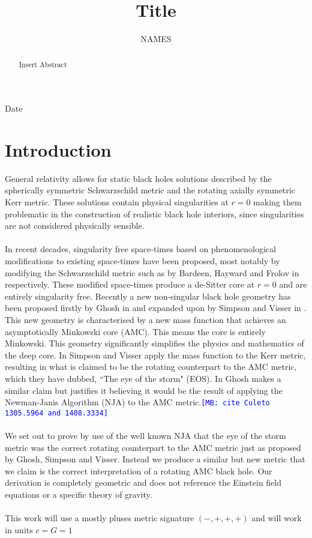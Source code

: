 \documentclass[12pt]{iopart}
\def\mbc#1{\textcolor{blue}{\tt[MB: #1]}}
\begin{document}
\title[Author guidelines for IOP Publishing journals in  \LaTeXe]{Title}

\author{NAMES}

\address{Institute of Cosmology and Gravitation
Dennis Sciama Building,Burnaby Road,Portsmouth,PO1 3FX, UK}
\vspace{10pt}
\begin{indented}
\item[]Date
\end{indented}

\begin{abstract}
Insert Abstract
\end{abstract}



\section{Introduction}
General relativity allows for static black holes solutions described by the spherically symmetric Schwarzschild metric and the rotating axially symmetric Kerr metric. These solutions contain physical singularities at $r=0$ making them problematic in the construction of realistic black hole interiors, since singularities are not considered physically sensible.
\\
\\
In recent decades, singularity free space-times based on phenomenological modifications to existing space-times have been proposed, most notably by modifying the Schwarzschild metric such as by Bardeen, Hayward and Frolov in \cite{Bardeen:1968, Hayward:2005gi, Frolov:2016pav} respectively. These modified space-times produce a de-Sitter core at $r=0$ and are entirely singularity free. Recently a new non-singular black hole geometry has been proposed firstly by Ghosh in \cite{Ghosh:2014pba} and expanded upon by Simpson and Visser in \cite{Simpson:2019mud}. This new geometry is characterised by a new mass function that achieves an asymptotically Minkowski core (AMC). This means the core is entirely Minkowski. This geometry significantly simplifies the physics and mathematics of the deep core. In \cite{Simpson:2021dyo} Simpson and Visser apply the mass function to the Kerr metric, resulting in what is claimed to be the rotating counterpart to the AMC metric, which they have dubbed, ``The eye of the storm" (EOS). In \cite{Ghosh:2014pba} Ghosh makes a similar claim but justifies it believing it would be the result of applying the Newman-Janis Algorithm (NJA) to the AMC metric.\mbc{cite Culeto 1305.5964 and 1408.3334}
\\
\\
We set out to prove by use of the well known NJA that the eye of the storm metric was the correct rotating counterpart to the AMC metric just as proposed by Ghosh, Simpson and Visser. Instead we produce a similar but new metric that we claim is the correct interpretation of a rotating AMC black hole. Our derivation is completely geometric and does not reference the Einstein field equations or a specific theory of gravity.
\\
\\
This work will use a mostly pluses metric signature $(-,+,+,+)$ and will work in units $c = G = 1$
\end{document}
